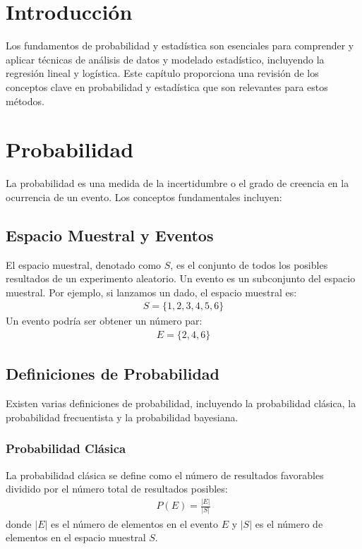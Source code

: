 \section{Introducci\'on}

Los fundamentos de probabilidad y estad\'istica son esenciales para comprender y aplicar t\'ecnicas de an\'alisis de datos y modelado estad\'istico, incluyendo la regresi\'on lineal y log\'istica. Este cap\'itulo proporciona una revisi\'on de los conceptos clave en probabilidad y estad\'istica que son relevantes para estos m\'etodos.

\section{Probabilidad}

La probabilidad es una medida de la incertidumbre o el grado de creencia en la ocurrencia de un evento. Los conceptos fundamentales incluyen:

\subsection{Espacio Muestral y Eventos}

El espacio muestral, denotado como $S$, es el conjunto de todos los posibles resultados de un experimento aleatorio. Un evento es un subconjunto del espacio muestral. Por ejemplo, si lanzamos un dado, el espacio muestral es:
\begin{eqnarray*}
S = \{1, 2, 3, 4, 5, 6\}
\end{eqnarray*}
Un evento podr\'ia ser obtener un n\'umero par:
\begin{eqnarray*}
E = \{2, 4, 6\}
\end{eqnarray*}

\subsection{Definiciones de Probabilidad}

Existen varias definiciones de probabilidad, incluyendo la probabilidad cl\'asica, la probabilidad frecuentista y la probabilidad bayesiana.

\subsubsection{Probabilidad Cl\'asica}

La probabilidad cl\'asica se define como el n\'umero de resultados favorables dividido por el n\'umero total de resultados posibles:
\begin{eqnarray*}
P(E) = \frac{|E|}{|S|}
\end{eqnarray*}
donde $|E|$ es el n\'umero de elementos en el evento $E$ y $|S|$ es el n\'umero de elementos en el espacio muestral $S$.

